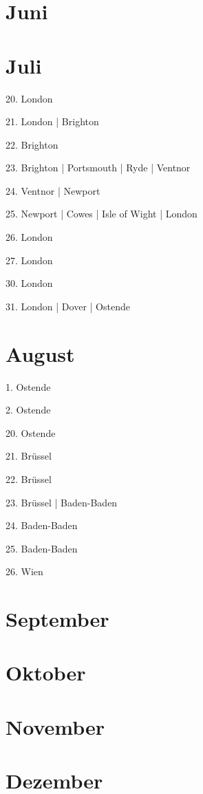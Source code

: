 \documentclass[twoside=false,titlepage=false,open=any, parskip=never, fontsize=10pt, headings=small, chapterprefix=false, appendixprefix=false, DIV=15]{scrbook}
\begin{document}
\begin{multicols}{3}
            \section*{Juni}
            \section*{Juli}
            20. London\par
            21. London | Brighton\par
            22. Brighton\par
            23. Brighton | Portsmouth | Ryde | Ventnor\par
            24. Ventnor | Newport\par
            25. Newport | Cowes | Isle of Wight | London\par
            26. London\par
            27. London\par
            30. London\par
            31. London | Dover | Ostende\par
            \section*{August}
            1. Ostende\par
            2. Ostende\par
            20. Ostende\par
            21. Brüssel\par
            22. Brüssel\par
            23. Brüssel | Baden-Baden\par
            24. Baden-Baden\par
            25. Baden-Baden\par
            26. Wien\par
            \section*{September}
            \section*{Oktober}
            \section*{November}
            \section*{Dezember}

\end{multicols}
\end{document}
